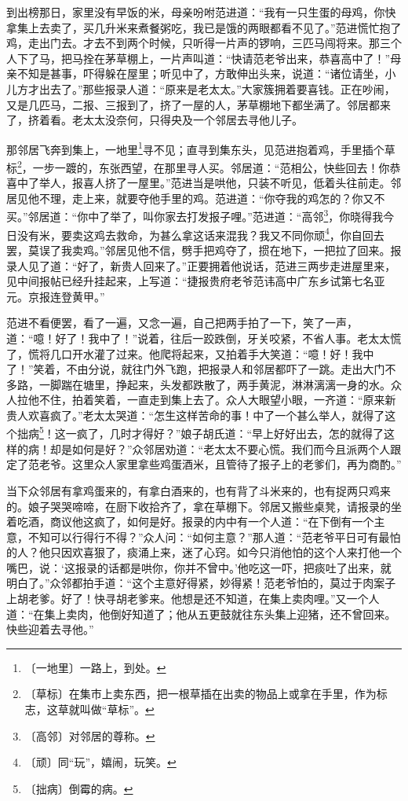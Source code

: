\documentclass[12pt,UTF-8,openany]{ctexbook}
\begin{document}
\begin{large}
    到出榜那日，家里没有早饭的米，母亲吩咐范进道：“我有一只生蛋的母鸡，你快拿集上去卖了，买几升米来煮餐粥吃，我已是饿的两眼都看不见了。”范进慌忙抱了鸡，走出门去。才去不到两个时候，只听得一片声的锣响，三匹马闯将来。那三个人下了马，把马拴在茅草棚上，一片声叫道：“快请范老爷出来，恭喜高中了！”母亲不知是甚事，吓得躲在屋里；听见中了，方敢伸出头来，说道：“诸位请坐，小儿方才出去了。”那些报录人道：“原来是老太太。”大家簇拥着要喜钱。正在吵闹，又是几匹马，二报、三报到了，挤了一屋的人，茅草棚地下都坐满了。邻居都来了，挤着看。老太太没奈何，只得央及一个邻居去寻他儿子。
    
    那邻居飞奔到集上，一地里\footnote{〔一地里〕一路上，到处。}寻不见；直寻到集东头，见范进抱着鸡，手里插个草标\footnote{〔草标〕在集市上卖东西，把一根草插在出卖的物品上或拿在手里，作为标志，这草就叫做“草标”。}，一步一踱的，东张西望，在那里寻人买。邻居道：“范相公，快些回去！你恭喜中了举人，报喜人挤了一屋里。”范进当是哄他，只装不听见，低着头往前走。邻居见他不理，走上来，就要夺他手里的鸡。范进道：“你夺我的鸡怎的？你又不买。”邻居道：“你中了举了，叫你家去打发报子哩。”范进道：“高邻\footnote{〔高邻〕对邻居的尊称。}，你晓得我今日没有米，要卖这鸡去救命，为甚么拿这话来混我？我又不同你顽\footnote{〔顽〕同“玩”，嬉闹，玩笑。}，你自回去罢，莫误了我卖鸡。”邻居见他不信，劈手把鸡夺了，掼在地下，一把拉了回来。报录人见了道：“好了，新贵人回来了。”正要拥着他说话，范进三两步走进屋里来，见中间报帖已经升挂起来，上写道：“捷报贵府老爷范讳高中广东乡试第七名亚元。京报连登黄甲。”
    
    范进不看便罢，看了一遍，又念一遍，自己把两手拍了一下，笑了一声，道：“噫！好了！我中了！”说着，往后一跤跌倒，牙关咬紧，不省人事。老太太慌了，慌将几口开水灌了过来。他爬将起来，又拍着手大笑道：“噫！好！我中了！”笑着，不由分说，就往门外飞跑，把报录人和邻居都吓了一跳。走出大门不多路，一脚踹在塘里，挣起来，头发都跌散了，两手黄泥，淋淋漓漓一身的水。众人拉他不住，拍着笑着，一直走到集上去了。众人大眼望小眼，一齐道：“原来新贵人欢喜疯了。”老太太哭道：“怎生这样苦命的事！中了一个甚么举人，就得了这个拙病\footnote{〔拙病〕倒霉的病。}！这一疯了，几时才得好？”娘子胡氏道：“早上好好出去，怎的就得了这样的病！却是如何是好？”众邻居劝道：“老太太不要心慌。我们而今且派两个人跟定了范老爷。这里众人家里拿些鸡蛋酒米，且管待了报子上的老爹们，再为商酌。”
    
    当下众邻居有拿鸡蛋来的，有拿白酒来的，也有背了斗米来的，也有捉两只鸡来的。娘子哭哭啼啼，在厨下收拾齐了，拿在草棚下。邻居又搬些桌凳，请报录的坐着吃酒，商议他这疯了，如何是好。报录的内中有一个人道：“在下倒有一个主意，不知可以行得行不得？”众人问：“如何主意？”那人道：“范老爷平日可有最怕的人？他只因欢喜狠了，痰涌上来，迷了心窍。如今只消他怕的这个人来打他一个嘴巴，说：‘这报录的话都是哄你，你并不曾中。’他吃这一吓，把痰吐了出来，就明白了。”众邻都拍手道：“这个主意好得紧，妙得紧！范老爷怕的，莫过于肉案子上胡老爹。好了！快寻胡老爹来。他想是还不知道，在集上卖肉哩。”又一个人道：“在集上卖肉，他倒好知道了；他从五更鼓就往东头集上迎猪，还不曾回来。快些迎着去寻他。”
    

\end{large}
\end{document}

